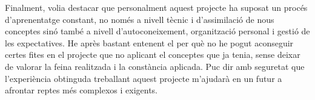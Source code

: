 Finalment, volia destacar que personalment aquest projecte ha suposat un procés
d'aprenentatge constant, no només a nivell tècnic i d'assimilació de nous
conceptes sinó també a nivell d'autoconeixement, organització personal i gestió
de les expectatives. He après bastant entenent el per què no he pogut
aconseguir certes fites en el projecte que no aplicant el conceptes que ja
tenia, sense deixar de valorar la feina realitzada i la constància aplicada.
Puc dir amb seguretat que l'experiència obtinguda treballant aquest projecte
m'ajudarà en un futur a afrontar reptes més complexos i exigents.